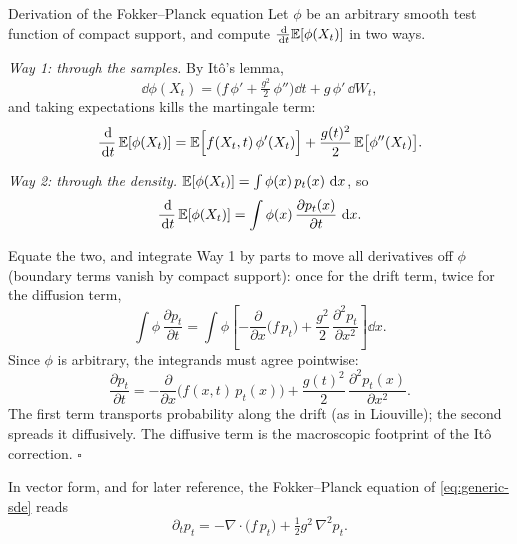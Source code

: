 \begin{toolbox}{Derivation of the Fokker--Planck equation}
Let $\phi$ be an arbitrary smooth test function of compact support, and
compute $\frac{\,\mathrm{d}}{\,\mathrm{d} t}\mathbb{E}[\phi(X_t)]$ in two ways.

\emph{Way 1: through the samples.} By It\^o's lemma,
\begin{equation*}
  \dd \phi(X_t)
  = \Big( f\,\phi' + \tfrac{g^2}{2}\,\phi'' \Big)\dd t
  + g\,\phi'\,\dd W_t ,
\end{equation*}
and taking expectations kills the martingale term:
\begin{equation*}
  \frac{\,\mathrm{d}}{\,\mathrm{d} t}\,\mathbb{E}[\phi(X_t)]
  = \mathbb{E}\Big[ f(X_t,t)\,\phi'(X_t) \Big]
  + \frac{g(t)^2}{2}\, \mathbb{E}\big[ \phi''(X_t) \big] .
\end{equation*}

\emph{Way 2: through the density.}
$\mathbb{E}[\phi(X_t)] = \int \phi(x)\, p_t(x)\,\,\mathrm{d} x$, so
\begin{equation*}
  \frac{\,\mathrm{d}}{\,\mathrm{d} t}\,\mathbb{E}[\phi(X_t)]
  = \int \phi(x)\, \frac{\partial p_t(x)}{\partial t}\, \,\mathrm{d} x .
\end{equation*}

Equate the two, and integrate Way 1 by parts to move all derivatives off
$\phi$ (boundary terms vanish by compact support): once for the drift
term, twice for the diffusion term,
\begin{equation*}
  \int \phi\, \frac{\partial p_t}{\partial t}
  = \int \phi \left[
      -\frac{\partial}{\partial x}\big( f\, p_t \big)
      + \frac{g^2}{2}\, \frac{\partial^2 p_t}{\partial x^2}
    \right] \dd x .
\end{equation*}
Since $\phi$ is arbitrary, the integrands must agree pointwise:
\begin{equation*}
  \boxed{\;
  \frac{\partial p_t}{\partial t}
  = -\frac{\partial}{\partial x}\big( f(x,t)\, p_t(x) \big)
  + \frac{g(t)^2}{2}\, \frac{\partial^2 p_t(x)}{\partial x^2} .
  \;}
\end{equation*}
The first term transports probability along the drift (as in Liouville);
the second spreads it diffusively. The diffusive term is the macroscopic
footprint of the It\^o correction. \hfill$\square$
\end{toolbox}

In vector form, and for later reference, the Fokker--Planck equation of
\eqref{eq:generic-sde} reads
\begin{equation}
  \partial_t p_t = -\nabla \cdot \big( f\, p_t \big)
  + \tfrac{1}{2} g^2\, \nabla^2 p_t .
  \label{eq:fokker-planck}
\end{equation}

